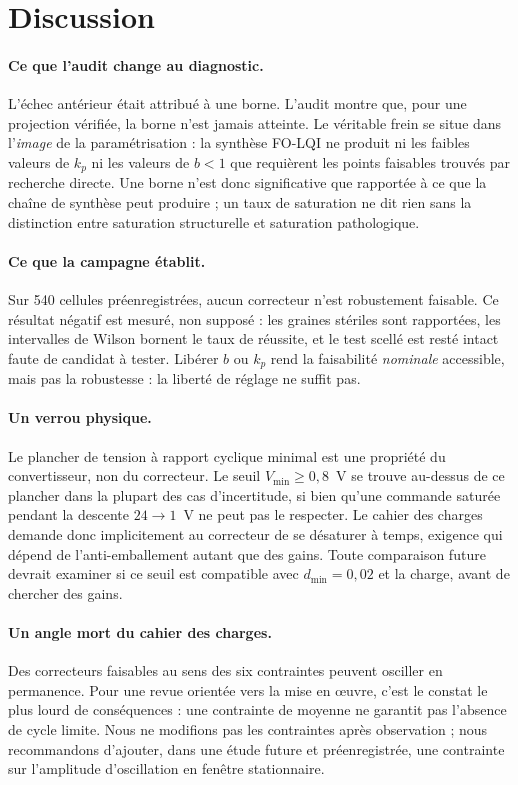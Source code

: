 \section{Discussion}
\label{sec:discussion}

\paragraph{Ce que l'audit change au diagnostic.}
L'échec antérieur était attribué à une borne. L'audit montre que, pour une
projection vérifiée, la borne n'est jamais atteinte. Le véritable frein se
situe dans l'\emph{image} de la paramétrisation : la synthèse FO-LQI ne produit
ni les faibles valeurs de $k_p$ ni les valeurs de $b<1$ que requièrent les
points faisables trouvés par recherche directe. Une borne n'est donc
significative que rapportée à ce que la chaîne de synthèse peut produire ; un
taux de saturation ne dit rien sans la distinction entre saturation
structurelle et saturation pathologique.

\paragraph{Ce que la campagne établit.}
Sur 540 cellules préenregistrées, aucun correcteur n'est robustement faisable.
Ce résultat négatif est mesuré, non supposé : les graines stériles sont
rapportées, les intervalles de Wilson bornent le taux de réussite, et le test
scellé est resté intact faute de candidat à tester. Libérer $b$ ou $k_p$ rend
la faisabilité \emph{nominale} accessible, mais pas la robustesse : la
liberté de réglage ne suffit pas.

\paragraph{Un verrou physique.}
Le plancher de tension à rapport cyclique minimal est une propriété du
convertisseur, non du correcteur. Le seuil $V_\mathrm{min}\ge0{,}8$~V se
trouve au-dessus de ce plancher dans la plupart des cas d'incertitude, si
bien qu'une commande saturée pendant la descente $24\to1$~V ne peut pas le
respecter. Le cahier des charges demande donc implicitement au correcteur de
se désaturer à temps, exigence qui dépend de l'anti-emballement autant que
des gains. Toute comparaison future devrait examiner si ce seuil est
compatible avec $d_\mathrm{min}=0{,}02$ et la charge, avant de chercher des
gains.

\paragraph{Un angle mort du cahier des charges.}
Des correcteurs faisables au sens des six contraintes peuvent osciller en
permanence. Pour une revue orientée vers la mise en œuvre, c'est le constat
le plus lourd de conséquences : une contrainte de moyenne ne garantit pas
l'absence de cycle limite. Nous ne modifions pas les contraintes après
observation ; nous recommandons d'ajouter, dans une étude future et
préenregistrée, une contrainte sur l'amplitude d'oscillation en fenêtre
stationnaire.

